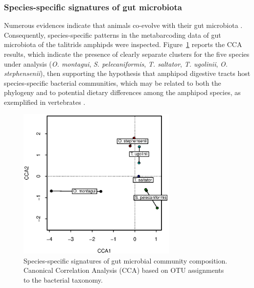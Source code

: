 \subsubsection{Species-specific signatures of gut microbiota}
Numerous evidences indicate that animals co-evolve with their gut microbiota \cite{ley2008worlds}. Consequently, species-specific patterns in the metabarcoding data of gut microbiota of the talitrids amphipds were inspected. Figure~\ref{fig:2talkal} reports the CCA  results, which indicate the presence of clearly separate clusters for the five species under analysis (\textit{O. montagui}, \textit{S. pelecaniformis}, \textit{T. saltator}, \textit{T. ugolinii}, \textit{O. stephensenii}), then supporting the hypothesis that amphipod digestive tracts host species-specific bacterial communities, which may be related to both the phylogeny and to potential dietary differences among the amphipod species, as exemplified in vertebrates \cite{ley2008worlds}.\\%
\begin{figure}[!tb]
	\centering
	\includegraphics[width=0.7\textwidth]{./figures/Chapter_6/Figure_2_talkaled.eps}
  	\caption{Species-specific signatures of gut microbial community composition. Canonical Correlation Analysis (CCA) based on OTU assignments to the bacterial taxonomy.\label{fig:2talkal}}
\end{figure}%
